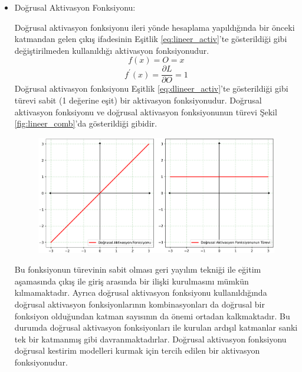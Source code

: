 \begin{itemize}
    \item Doğrusal Aktivasyon Fonksiyonu:
    
    Doğrusal aktivasyon fonksiyonu ileri yönde hesaplama yapıldığında bir önceki katmandan gelen çıkış ifadesinin Eşitlik \ref{eq:lineer_activ}'te gösterildiği gibi değiştirilmeden kullanıldığı aktivasyon fonksiyonudur.
    {\setlength{\mathindent}{0cm}
    \begin{equation}
    	\label{eq:lineer_activ}
    	f(x)=O=x
    \end{equation}
    \vspace{-1.5cm}
    \begin{equation}
    	\label{eq:dlineer_activ}
    	f^{\prime}(x)=\frac{\partial L}{\partial  O}=1
    \end{equation}}    
    Doğrusal aktivasyon fonksiyonu Eşitlik \ref{eq:dlineer_activ}'te gösterildiği gibi türevi sabit (1 değerine eşit) bir aktivasyon fonksiyonudur. Doğrusal aktivasyon fonksiyonu ve doğrusal aktivasyon fonksiyonunun türevi Şekil \ref{fig:lineer_comb}'da gösterildiği gibidir.    
    \begin{figure}[h!]
    	\begin{center}
    		\vspace{0.4cm}
    		{
    			\vspace{0.4cm}
    			\includegraphics[scale=0.5]{Yapilan-Calismalar/Figures/lineer_comb.pdf}
    		}
    	\end{center}
    \end{figure}    
    Bu fonksiyonun türevinin sabit olması geri yayılım tekniği ile eğitim aşamasında çıkış ile giriş arasında bir ilişki kurulmasını mümkün kılmamaktadır. Ayrıca doğrusal aktivasyon fonksiyonu kullanıldığında doğrusal aktivasyon fonksiyonlarının kombinasyonları da doğrusal bir fonksiyon olduğundan katman sayısının da önemi ortadan kalkmaktadır. Bu durumda doğrusal aktivasyon fonksiyonları ile kurulan ardışıl katmanlar sanki tek bir katmanmış gibi davranmaktadırlar. Doğrusal aktivasyon fonksiyonu doğrusal kestirim modelleri kurmak için tercih edilen bir aktivasyon fonksiyonudur.
    

\end{itemize}
